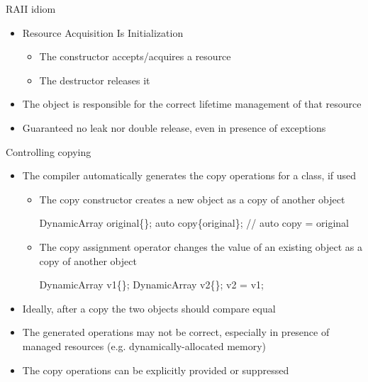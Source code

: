 \begin{frame}{RAII idiom}

  \begin{itemize}[<+->]
  \item Resource Acquisition Is Initialization
    \begin{itemize}
    \item The constructor accepts/acquires a resource
    \item The destructor releases it
    \end{itemize}
  \item The object is responsible for the correct lifetime management of that
    resource
  \item Guaranteed no leak nor double release, even in presence of exceptions
  \end{itemize}

\end{frame}

\begin{frame}[fragile]{Controlling copying}
  \begin{itemize}
  \item<1-> The compiler automatically generates the copy operations for a class, if used
    \begin{itemize}
    \item The copy constructor creates a \alert{new} object as a copy of
      another object

      \begin{codeblock}
DynamicArray original\{\ddd\};
auto copy\{original\}; // auto copy = original\end{codeblock}

    \item The copy assignment operator changes the value of an \alert{existing}
      object as a copy of another object

      \begin{codeblock}
DynamicArray v1\{\ddd\};
DynamicArray v2\{\ddd\};
v2 = v1;\end{codeblock}

    \end{itemize}

  \item<2-> Ideally, after a copy the two objects should compare equal
  \item<3-> The generated operations may not be correct, especially in presence of
    managed resources (e.g. dynamically-allocated memory)
  \item<3-> The copy operations can be explicitly provided or suppressed
  \end{itemize}
\end{frame}

